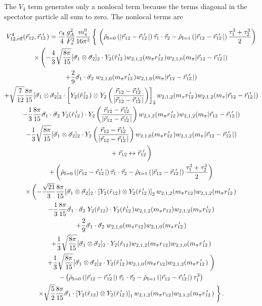 The $V_4$ term generates only a nonlocal term because the terms diagonal in the spectator particle all sum to zero. The nonlocal terms are

\begin{multline}
V^{4}_{12,\text{eff}}(\rot,\rotp) = \frac{c_4}{4}\frac{g_A^2}{F_\pi^2}\frac{m_\pi^9}{16\pi^2}\left\{ \fracphantom \right. 
\left(\rhohat{0}{|\rot-\rotp|}\taudot-\rhohat{1}{|\rot-\rotp|}\tauplusthree\right)
\\
\times\left( -\frac{4}{3}\sqrt{\frac{8\pi}{15}}\sigmatwo\cdot Y_2(\rotphat)\w{2}{1}{2}{m_\pi \rotpr}\w{2}{1}{0}{m_\pi |\rot-\rotp|} \right. \\
+\frac{2}{9}\sigmadot\; \w{2}{1}{0}{m_\pi \rotpr}\w{2}{1}{0}{m_\pi |\rot-\rotp|} \\
+\sqrt{\frac{7}{12}}\frac{8\pi}{15}\sigmatwo\cdot \left[ Y_2(\rotphat)\otimes Y_2 \left(\frac{\rot-\rotp}{|\rot-\rotp|}\right) \right]_2 \w{2}{1}{2}{m_\pi \rotpr}\w{2}{1}{2}{m_\pi |\rot-\rotp|} \\
-\frac{1}{3}\frac{8\pi}{15}\sigmadot \; Y_2(\rotphat)\cdot Y_2\left(\frac{\rot-\rotp}{|\rot-\rotp|}\right) \w{2}{1}{2}{m_\pi \rotpr}\w{2}{1}{2}{m_\pi |\rot-\rotp|} \\
-\frac{1}{3}\sqrt{\frac{8\pi}{15}}\sigmatwo\cdot Y_2\left(\frac{\rot-\rotp}{|\rot-\rotp|}\right)\w{2}{1}{0}{m_\pi \rotpr}\w{2}{1}{2}{m_\pi |\rot-\rotp|} \\
\left.+\; \rot \leftrightarrow \rotp \fracphantom\right) \\
+\left(\rhohat{0}{|\rot-\rotp|}\taudot-\rhohat{1}{|\rot-\rotp|}\tauplusthree\right) \\*
\times \left( 
-\frac{\sqrt{21}}{3}\frac{8\pi}{15}\sigmatwo \cdot \left[Y_2(\hat{r}_{12})\otimes Y_2(\rotphat)\right]_2 \w{2}{1}{2}{m_\pi r_{12}} \w{2}{1}{2}{m_\pi \rotpr} \right. \\
-\frac{1}{3}\frac{8\pi}{15}\sigmadot\; Y_2(\hat{r}_{12}) \cdot Y_2(\rotphat)\w{2}{1}{2}{m_\pi r_{12}} \w{2}{1}{2}{m_\pi \rotpr} \\
+\frac{2}{9}\sigmadot \;\w{2}{1}{0}{m_\pi r_{12}} \w{2}{1}{0}{m_\pi \rotpr} \\
+\frac{1}{3}\sqrt{\frac{8\pi}{15}} \sigmatwo \cdot Y_2(\hat{r}_{12}) \w{2}{1}{2}{m_\pi r_{12}} \w{2}{1}{0}{m_\pi \rotpr} \\
+\frac{1}{3}\sqrt{\frac{8\pi}{15}} \sigmatwo \cdot Y_2(\rotphat) \w{2}{1}{0}{m_\pi r_{12}} \w{2}{1}{2}{m_\pi \rotpr} \left.\fracphantom\right) \\
%
-\left(\rhohat{0}{|\rot-\rotp|}\taudot-\rhohat{1}{|\rot-\rotp|}\tau_1^3 \right) \\
\times\sqrt{\frac{5}{2}} \frac{8\pi}{15} \vec{\sigma}_1\cdot\left[Y_2(\hat{r}_{12})\otimes Y_2(\rotphat)\right]_1 \w{2}{1}{2}{m_\pi r_{12}} \w{2}{1}{2}{m_\pi \rotpr} \left.\fracphantom\right\}.
\end{multline}



%

